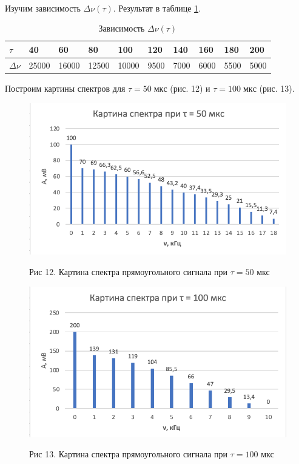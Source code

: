 \documentclass[a4paper,12pt]{article} %
\begin{document}
\\
\
\\
\

Изучим зависимость $ \Delta \nu (\tau) $. Результат в таблице \ref{tab:nu-tau}.
\begin{table}[h]
	\centering
	\begin{tabular}{|l|l|l|l|l|l|l|l|l|l|}
		\hline
		${\tau}$      & 40    & 60    & 80    & 100   & 120  & 140  & 160  & 180  & 200  \\ \hline
		${\Delta \nu}$ & 25000 & 16000 & 12500 & 10000 & 9500 & 7000 & 6000 & 5500 & 5000 \\ \hline
	\end{tabular}
	\caption{Зависимость $\Delta \nu (\tau)$}
	\label{tab:nu-tau}
\end{table}

Построим картины спектров для $ \tau  =  50\; мкс $ (рис. 12) и $ \tau = 100\; мкс $ (рис. 13).

\begin{figure}[p]
	\centering
	\includegraphics[width=0.8\linewidth]{"50"}
                     \begin{center}
                    {Рис 12.} Картина спектра прямоугольного сигнала при $\tau = 50$ мкс\\
                    \end{center}

	\label{fig:1-50}
\end{figure}

\begin{figure}[p]
	\centering
	\includegraphics[width=0.8\linewidth]{"100"}
 \begin{center}
                    {Рис 13.} Картина спектра прямоугольного сигнала при $\tau = 100$ мкс\\
                    \end{center}
	\label{fig:1-100}
\end{figure}
\end{document}
